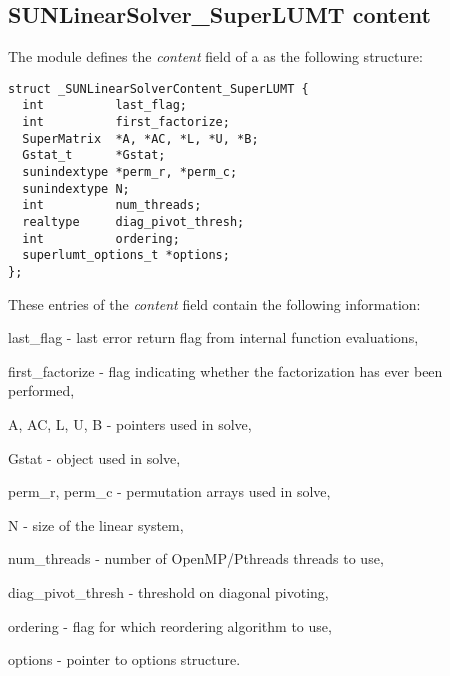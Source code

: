 \subsection{SUNLinearSolver\_SuperLUMT content}
\label{ss:sunlinsol_slumt_content}

The {\sunlinsolslumt} module defines the \textit{content} field of a
 as the following structure:
\begin{verbatim}
struct _SUNLinearSolverContent_SuperLUMT {
  int          last_flag;
  int          first_factorize;
  SuperMatrix  *A, *AC, *L, *U, *B;
  Gstat_t      *Gstat;
  sunindextype *perm_r, *perm_c;
  sunindextype N;
  int          num_threads;
  realtype     diag_pivot_thresh;
  int          ordering;
  superlumt_options_t *options;
};
\end{verbatim}
These entries of the \emph{content} field contain the following
information:
\begin{args}
  \item[last\_flag] - last error return flag from internal function evaluations,
  \item[first\_factorize] - flag indicating whether the factorization
    has ever been performed,
  \item[A, AC, L, U, B] -  pointers used in solve,
  \item[Gstat] -  object used in solve,
  \item[perm\_r, perm\_c] - permutation arrays used in solve,
  \item[N] - size of the linear system,
  \item[num\_threads] - number of OpenMP/Pthreads threads to use,
  \item[diag\_pivot\_thresh] - threshold on diagonal pivoting,
  \item[ordering] - flag for which reordering algorithm to use,
  \item[options] - pointer to {\superlumt} options structure.
\end{args}
